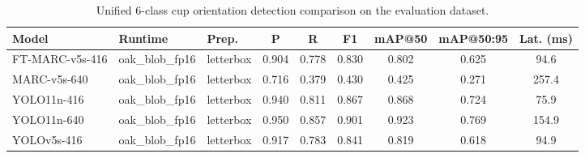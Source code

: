 \begin{table}[t]
  \centering
  \caption{Unified 6-class cup orientation detection comparison on the evaluation dataset.}
  \label{tab:yolo-comparison}
  \begin{tabular}{lllcccccc}
    \toprule
    Model & Runtime & Prep. & P & R & F1 & mAP@50 & mAP@50:95 & Lat. (ms) \\
    \midrule
    FT-MARC-v5s-416 & oak\_blob\_fp16 & letterbox & 0.904 & 0.778 & 0.830 & 0.802 & 0.625 & 94.6 \\
    MARC-v5s-640 & oak\_blob\_fp16 & letterbox & 0.716 & 0.379 & 0.430 & 0.425 & 0.271 & 257.4 \\
    YOLO11n-416 & oak\_blob\_fp16 & letterbox & 0.940 & 0.811 & 0.867 & 0.868 & 0.724 & 75.9 \\
    YOLO11n-640 & oak\_blob\_fp16 & letterbox & 0.950 & 0.857 & 0.901 & 0.923 & 0.769 & 154.9 \\
    YOLOv5s-416 & oak\_blob\_fp16 & letterbox & 0.917 & 0.783 & 0.841 & 0.819 & 0.618 & 94.9 \\
    \bottomrule
  \end{tabular}
\end{table}
